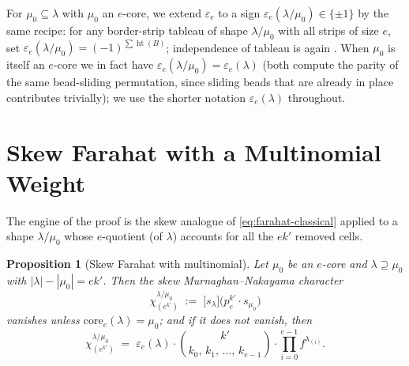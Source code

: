 \documentclass[11pt]{article}
\newtheorem{proposition}[theorem]{Proposition}
\theoremstyle{definition}
\theoremstyle{remark}
\DeclareMathOperator{\hgt}{ht}
\newcommand{\core}{\mathrm{core}}
\begin{document}
For $\mu_0\subseteq\lambda$ with $\mu_0$ an $e$-core, we extend
$\varepsilon_e$ to a sign
$\varepsilon_e(\lambda/\mu_0)\in\{\pm 1\}$ by the same recipe: for any
border-strip tableau of shape $\lambda/\mu_0$ with all strips of size $e$,
set $\varepsilon_e(\lambda/\mu_0)=(-1)^{\sum \hgt(B)}$; independence of
tableau is again \cite[\S 2.7]{JK81}. When $\mu_0$ is itself an $e$-core we
in fact have $\varepsilon_e(\lambda/\mu_0)=\varepsilon_e(\lambda)$ (both
compute the parity of the same bead-sliding permutation, since sliding beads
that are already in place contributes trivially); we use the shorter notation
$\varepsilon_e(\lambda)$ throughout.

\section{Skew Farahat with a Multinomial Weight}
\label{sec:skew}

The engine of the proof is the skew analogue of \eqref{eq:farahat-classical}
applied to a shape $\lambda/\mu_0$ whose $e$-quotient (of $\lambda$) accounts
for all the $ek'$ removed cells.

\begin{proposition}[Skew Farahat with multinomial]
\label{prop:skew-farahat}
Let $\mu_0$ be an $e$-core and $\lambda\supseteq\mu_0$ with
$|\lambda|-|\mu_0|=ek'$. Then the skew Murnaghan--Nakayama character
\[
  \chi^{\lambda/\mu_0}_{(e^{k'})}
  \;:=\;
  \bigl[s_\lambda\bigr]\bigl(p_e^{k'}\cdot s_{\mu_0}\bigr)
\]
vanishes unless $\core_e(\lambda)=\mu_0$; and if it does not vanish, then
\begin{equation}
\label{eq:skew-farahat}
  \chi^{\lambda/\mu_0}_{(e^{k'})}
  \;=\;
  \varepsilon_e(\lambda)\cdot
  \binom{k'}{k_0,\,k_1,\,\ldots,\,k_{e-1}}
  \cdot\prod_{i=0}^{e-1}f^{\lambda_{(i)}}.
\end{equation}
\end{proposition}
\end{document}
